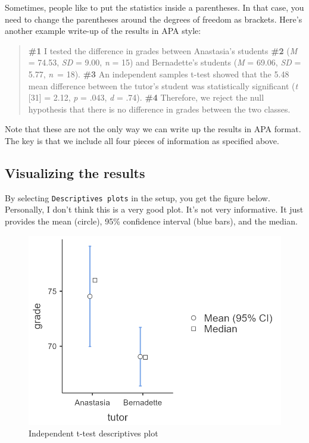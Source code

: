\documentclass[
]{book}
\begin{document}
Sometimes, people like to put the statistics inside a parentheses. In that case, you need to change the parentheses around the degrees of freedom as brackets. Here's another example write-up of the results in APA style:

\begin{quote}
\textbf{\#1} I tested the difference in grades between Anastasia's students \textbf{\#2} (\emph{M} = 74.53, \emph{SD} = 9.00, \emph{n} = 15) and Bernadette's students (\emph{M} = 69.06, \emph{SD} = 5.77, \emph{n}~= 18). \textbf{\#3} An independent samples t-test showed that the 5.48 mean difference between the tutor's student was statistically significant (\emph{t} {[}31{]} = 2.12, \emph{p} = .043, \emph{d} = .74). \textbf{\#4} Therefore, we reject the null hypothesis that there is no difference in grades between the two classes.
\end{quote}

Note that these are not the only way we can write up the results in APA format. The key is that we include all four pieces of information as specified above.

\hypertarget{visualizing-the-results}{%
\subsection{Visualizing the results}\label{visualizing-the-results}}

By selecting \texttt{Descriptives\ plots} in the setup, you get the figure below. Personally, I don't think this is a very good plot. It's not very informative. It just provides the mean (circle), 95\% confidence interval (blue bars), and the median.

\begin{figure}

{\centering \includegraphics[width=1\linewidth]{images/02-independent_t-test/independent_t-test_plot2} 

}

\caption{Independent t-test descriptives plot}\label{fig:unnamed-chunk-9}
\end{figure}
\end{document}
